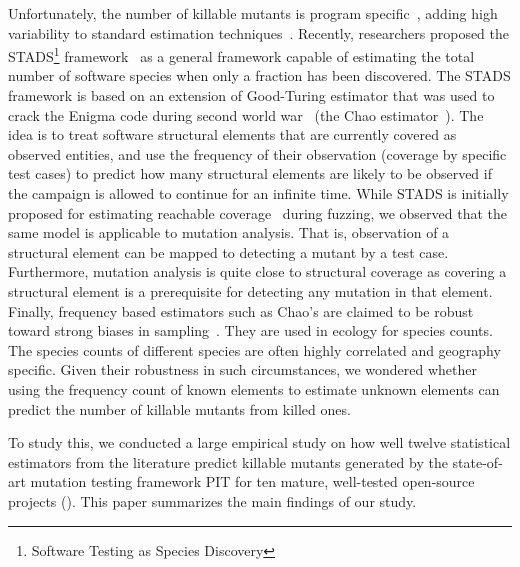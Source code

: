 \documentclass[sigconf,review,anonymous]{acmart}
\newcommand{\estimatorCount}{twelve\xspace}
\newcommand{\projectCount}{ten\xspace}
\newcommand{\PIT}{\textsc{PIT}\xspace}
\begin{document}
Unfortunately, the number of killable mutants is program specific~\cite{offutt1994using,grun2009impact}, adding high variability to standard estimation techniques~\cite{gotelli2011estimating}.
Recently, researchers proposed the STADS\footnote{
Software Testing as Species Discovery
} framework~\cite{bohme2018assurances}
as a general framework capable of estimating the total number of software
species when only a fraction has been discovered.
The STADS framework is based on an extension of Good-Turing estimator that was used to crack the Enigma code during second world war~\cite{fuzzingbook2023:WhenToStopFuzzing}
(the Chao estimator~\cite{chao2016nonparametric}).
The idea is to treat software structural elements that are currently covered as observed entities, and use the frequency of their observation (coverage by specific test cases) to predict how many structural
elements are likely to be observed if the campaign is allowed to continue for an infinite time.
While STADS is initially proposed for estimating reachable coverage~\cite{fuzzingbook2023:WhenToStopFuzzing} during fuzzing, we observed that the same model is applicable to mutation analysis. That is, observation of a structural element can be mapped to detecting a mutant by a test case. Furthermore, mutation analysis is quite close to structural coverage
as covering a structural element is a prerequisite for detecting any mutation in that element.
Finally, frequency based estimators such as Chao's are claimed to be robust toward strong biases in sampling~\cite{chao2016species}.
They are used in ecology for species counts. The species counts of different species are often highly correlated and geography specific. Given their robustness in such circumstances,
we wondered whether using the frequency count of known elements to estimate unknown elements can predict the number of killable mutants from killed ones.

%
%
%
To study this,
we conducted a large empirical study on how well
\estimatorCount statistical estimators from the literature predict killable mutants
generated by the state-of-art mutation testing framework \PIT\cite{pit}
for \projectCount  mature, well-tested open-source projects (). %
This paper
summarizes the main findings of our study.
\end{document}
